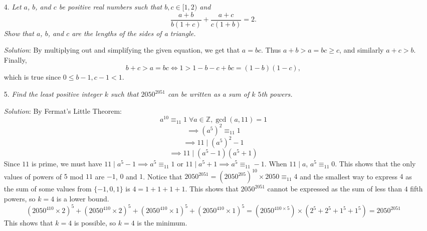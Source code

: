 \documentclass{article}
\begin{document}
\begin{enumerate}[1.]
\textit{Solution}:
Emma can guarantee that she always wins.

Let us assume that the board is coloured like a chessboard. Emma moves first, so she can start by placing a knight on the block in the centre of the board on her first move. 
Now, whatever move Emile plays, Emma plays the same move, but rotates it $180^o$ around the centre of the board. 
If Emile makes a legal move, it will not invalidate the square rotated $180^o$ from it, since knights attack squares of opposite colour and the squares that are $180^o$ rotations of each other are the same colour.
This guarantees that Emma will always be able to play if Emile can play.
Therefore, the first person who will not be able to make a move is Emile, so Emma must win.
\vfill


\item[4.] %
\textit{Let $a$, $b$, and $c$ be positive real numbers such that $b, c \in [1,2)$ and
\[ \frac{a+b}{b(1+c)} +\frac{a+c}{c(1+b)} = 2. \]
Show that $a$, $b$, and $c$ are the lengths of the sides of a triangle.}

\textit{Solution}:
By multiplying out and simplifying the given equation, we get that $a = bc$.
Thus $a + b > a = bc \geq c$, and similarly $a+c > b$.
Finally,
\[ b+c > a = bc \iff 1 > 1 -b -c +bc = (1-b)(1-c), \]
which is true since $0 \leq b-1, c-1 < 1$.
\vfill


\item[5.] %
\textit{Find the least positive integer $k$ such that $2050^{2051}$ can be written as a sum of $k$ $5$th powers.}

\textit{Solution}: 
By Fermat's Little Theorem: 
$$a^{10} \equiv _{11} 1 \; \forall a \in \mathbb{Z}, \gcd(a, 11) = 1$$ 
$$\implies (a^5)^2 \equiv _{11} 1$$
$$\implies 11 \mid (a^5)^2 - 1$$
$$\implies 11 \mid (a^5 - 1)(a^5 + 1)$$
Since $11$ is prime, we must have $11 \mid a^5 - 1 \implies a^5 \equiv _{11} 1$ or $11 \mid a^5 + 1 \implies a^5 \equiv _{11} -1$. When $11 \mid a$, $a^5 \equiv _{11} 0$.
This shows that the only values of powers of $5$ mod $11$ are $-1$, $0$ and $1$. Notice that $2050^{2051} = (2050^{205})^{10} \times 2050 \equiv _{11} 4$ and the smallest way to express $4$ as the sum of some values from $\{-1, 0, 1\}$ is $4 = 1 + 1 + 1 + 1$.
This shows that $2050^{2051}$ cannot be expressed as the sum of less than $4$ fifth powers, so $k = 4$ is a lower bound.
$$(2050^{410} \times 2)^5 + (2050^{410} \times 2)^5 + (2050^{410} \times 1)^5 + (2050^{410} \times 1)^5 = (2050^{410 \times 5}) \times (2^5 + 2^5 + 1^5 + 1^5) = 2050^{2051}$$
This shows that $k = 4$ is possible, so $k = 4$ is the minimum.

\end{enumerate}
\end{document}
